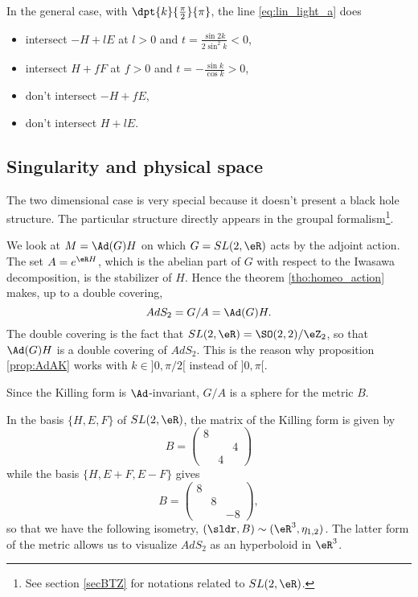 In the general case, with $\dpt{k}{\frac{\pi}{2}}{\pi}$, the line \eqref{eq:lin_light_a} does

\begin{itemize}
\item intersect $-H+lE$ at $l>0$ and $t=\frac{\sin 2k}{2\sin^2k}<0$,
\item intersect $H+fF$ at $f>0$ and $t=-\frac{\sin k}{\cos k}>0$,
\item don't intersect $-H+fE$,
\item don't intersect $H+lE$.
\end{itemize}


\subsection{Singularity and physical space}

The two dimensional case is very special because it doesn't present a black hole structure. The particular structure directly appears in the groupal formalism\footnote{See section \ref{secBTZ} for notations related to $SL(2,\eR)$.}.

We look at $M=\Ad(G)H$ on which $G=SL(2,\eR)$ acts by the adjoint action. The set $A=e^{\eR H}$, which is the abelian part of $G$ with respect to the Iwasawa decomposition, is the stabilizer of $H$. Hence the theorem \ref{tho:homeo_action} makes, up to a double covering,
\begin{equation}
AdS_2=G/A=\Ad(G)H.
\end{equation}
The double covering is the fact that $SL(2,\eR)=\SO(2,2)/\eZ_2$, so that $\Ad(G)H$ is a double covering of $AdS_2$. This is the reason why proposition \ref{prop:AdAK} works with $k\in]0,\pi/2[$ instead of $]0,\pi[$.

Since the Killing form is $\Ad$-invariant, $G/A$ is a sphere for the metric $B$.

 In the basis $\{H,E,F\}$ of $SL(2,\eR)$, the matrix of the Killing form is given by
\begin{equation}
B=
\begin{pmatrix}
8&&\\
&&4\\
&4&
\end{pmatrix}
\end{equation}
while the basis  $\{H,E+F,E-F\}$ gives
\[
B=
\begin{pmatrix}
8\\
&8\\
&&-8
\end{pmatrix},
\]
so that we have the following isometry, $(\sldr,B)\sim(\eR^3,\eta_{1,2})$. The latter form of the metric allows us to visualize $AdS_2$ as an hyperboloid in $\eR^3$.

